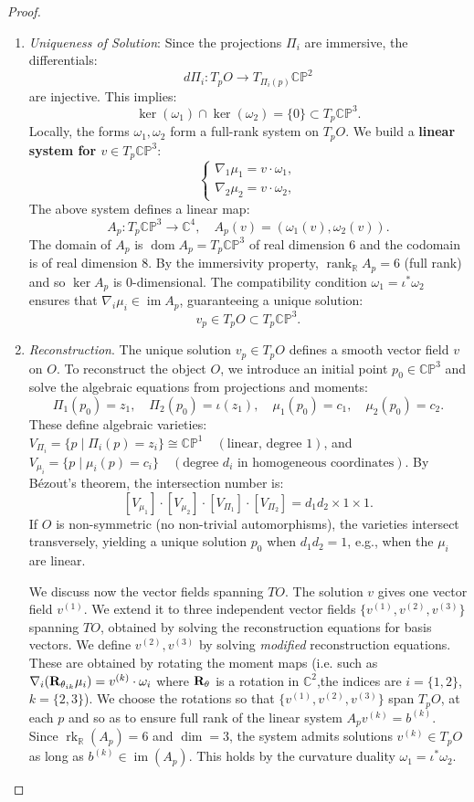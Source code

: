 \documentclass[10pt,a4paper]{amsart}
\begin{document}
\begin{proof}
\begin{enumerate}
    \item {\it Uniqueness of Solution}:
Since the projections $\Pi_i$ are immersive, the differentials:
\[
d\Pi_i : T_p O \to T_{\Pi_i(p)} \mathbb{CP}^2
\]
are injective. This implies:
\[
\ker(\omega_1) \cap \ker(\omega_2) = \{ 0 \} \subset T_p \mathbb{CP}^3.
\]
Locally, the forms $\omega_1, \omega_2$ form a full-rank system on $T_p O$. We  build a \textbf{linear system for $v\in T_p \mathbb{CP}^3$}:
\[
\begin{cases}
\nabla_1 \mu_1 = v \cdot \omega_1, \\
\nabla_2 \mu_2 = v \cdot \omega_2,
\end{cases}
\]
The above system defines a linear map:
\[
A_p : T_p \mathbb{CP}^3 \to \mathbb{C}^4, \quad A_p(v) = \left( \omega_1(v), \omega_2(v) \right).
\]
The domain of $A_p$ is $\operatorname{dom} A_p = T_p \mathbb{CP}^3$ of real dimension 6 and the codomain is of real dimension $8$. By the immersivity property, $\operatorname{rank}_\mathbb{R} A_p = 6$ (full rank) and so $\ker A_p$ is 0-dimensional. The compatibility condition $\omega_1 = \iota^* \omega_2$ ensures that $\nabla_i \mu_i \in \operatorname{im} A_p$, guaranteeing a unique solution:
\[
v_p \in T_p O \subset T_p \mathbb{CP}^3.
\]
  \item {\it Reconstruction}. The unique solution $v_p\in T_pO$ defines a smooth vector field $v$ on $O$. To reconstruct the object $O$, we introduce an initial point $p_0 \in \mathbb{CP}^3$ and solve the algebraic equations from projections and moments:
\[
\Pi_1(p_0) = z_1, \quad \Pi_2(p_0) = \iota(z_1),\quad
\mu_1(p_0) = c_1, \quad \mu_2(p_0) = c_2.
\]
These define algebraic varieties:
$V_{\Pi_i} = \{ p \mid \Pi_i(p) = z_i \} \cong \mathbb{CP}^1 \quad (\text{linear, degree 1})$,
and $V_{\mu_i} = \{ p \mid \mu_i(p) = c_i \} \quad (\text{degree } d_i \text{ in homogeneous coordinates}).$
By Bézout’s theorem, the intersection number is:
\[
[V_{\mu_1}] \cdot [V_{\mu_2}] \cdot [V_{\Pi_1}] \cdot [V_{\Pi_2}] = d_1 d_2 \times 1 \times 1.
\]
If $O$ is non-symmetric (no non-trivial automorphisms), the varieties intersect transversely, yielding a unique solution $p_0$ when $d_1 d_2 = 1$, e.g., when the $\mu_i$ are linear.

\medskip 

We discuss now the vector fields spanning $TO$.  The solution $v$ gives one vector field $v^{(1)}$. We extend it to three independent vector fields $\{v^{(1)}, v^{(2)}, v^{(3)}\}$ spanning $TO$, obtained by solving the reconstruction equations for basis vectors. We define $ v^{(2)}, v^{(3)}$ by solving {\it modified} reconstruction equations. These are obtained by rotating the moment maps (i.e. such as $\nabla_i({\bf R}_{\theta_{ik}}\mu_i)=v^{(k)}\cdot \omega_i$ where ${\bf R}_{\theta}$ is a rotation in $\mathbb{C}^2$,the indices are $i=\{1,2\}$, $k=\{2,3\}$). We choose the rotations so that $\{v^{(1)}, v^{(2)}, v^{(3)}\}$ span $T_pO$, at each $p$ and so as to ensure full rank of the linear system $A_pv^{(k)}=b^{(k)}$. Since $\operatorname{rk}_{\mathbb{R}}(A_p)=6$ and $\operatorname{dim}=3$, the system admits solutions $v^{(k)}\in T_pO$ as long as $b^{(k)}\in  \operatorname{im}(A_p)$. This holds by the curvature duality $\omega_1=\iota^*\omega_2$.


\end{enumerate}
\end{proof}
\end{document}
